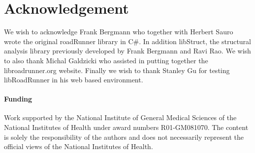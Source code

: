 \documentclass{bioinfo}
\begin{document}
\section*{Acknowledgement}
We wish to acknowledge Frank Bergmann who together with Herbert Sauro wrote the original roadRunner library in C\#. In addition libStruct, the structural analysis library previously developed by Frank Bergmann and Ravi Rao. We wish to also thank Michal Galdzicki who assisted in putting together the libroadrunner.org website. Finally we wish to thank Stanley Gu for testing libRoadRunner in his web based environment.

\paragraph{Funding\textcolon} Work supported by the National Institute of General Medical Sciences of the National Institutes of Health under award numbers R01-GM081070. The content is solely the responsibility of the authors and does not necessarily represent the official views of the National Institutes of Health.

%
%
%
%
%
%
%
%
%
\end{document}
